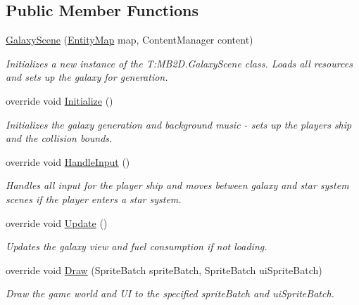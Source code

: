 \subsection*{Public Member Functions}
\begin{DoxyCompactItemize}
\item 
\hyperlink{class_midnight_blue_1_1_galaxy_scene_acdd82e3464ea18ca77bcf4694e9803a5}{Galaxy\+Scene} (\hyperlink{class_m_b2_d_1_1_entity_component_1_1_entity_map}{Entity\+Map} map, Content\+Manager content)
\begin{DoxyCompactList}\small\item\em Initializes a new instance of the T\+:\+M\+B2\+D.\+Galaxy\+Scene class. Loads all resources and sets up the galaxy for generation. \end{DoxyCompactList}\item 
override void \hyperlink{class_midnight_blue_1_1_galaxy_scene_a97d97e56a73d9a4b7caf6dd6ce86647e}{Initialize} ()
\begin{DoxyCompactList}\small\item\em Initializes the galaxy generation and background music -\/ sets up the players ship and the collision bounds. \end{DoxyCompactList}\item 
override void \hyperlink{class_midnight_blue_1_1_galaxy_scene_afd7f8c9f6d0cf6ded10299d4b0015c29}{Handle\+Input} ()
\begin{DoxyCompactList}\small\item\em Handles all input for the player ship and moves between galaxy and star system scenes if the player enters a star system. \end{DoxyCompactList}\item 
override void \hyperlink{class_midnight_blue_1_1_galaxy_scene_a9dfa66406143ed20f4d534c768f05a78}{Update} ()
\begin{DoxyCompactList}\small\item\em Updates the galaxy view and fuel consumption if not loading. \end{DoxyCompactList}\item 
override void \hyperlink{class_midnight_blue_1_1_galaxy_scene_a3646fcf97e067bac267d42aad66e71c4}{Draw} (Sprite\+Batch sprite\+Batch, Sprite\+Batch ui\+Sprite\+Batch)
\begin{DoxyCompactList}\small\item\em Draw the game world and UI to the specified sprite\+Batch and ui\+Sprite\+Batch. \end{DoxyCompactList}\item 

\end{DoxyCompactItemize}
